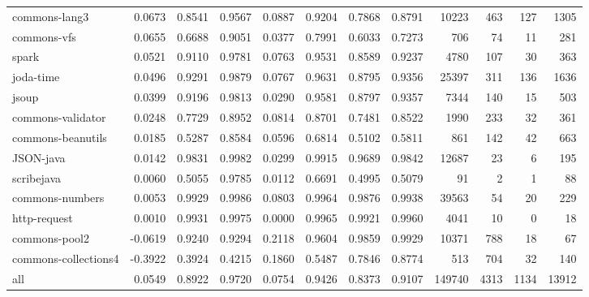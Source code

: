\begin{table}
\begin{tabular}{lrrrrrrrrrrr}
          commons-lang3 &      0.0673 &  0.8541 &     0.9567 &     0.0887 &  0.9204 &     0.7868 &   0.8791 &   10223 &   463 &   127 &   1305 \\
            commons-vfs &      0.0655 &  0.6688 &     0.9051 &     0.0377 &  0.7991 &     0.6033 &   0.7273 &     706 &    74 &    11 &    281 \\
                  spark &      0.0521 &  0.9110 &     0.9781 &     0.0763 &  0.9531 &     0.8589 &   0.9237 &    4780 &   107 &    30 &    363 \\
              joda-time &      0.0496 &  0.9291 &     0.9879 &     0.0767 &  0.9631 &     0.8795 &   0.9356 &   25397 &   311 &   136 &   1636 \\
                  jsoup &      0.0399 &  0.9196 &     0.9813 &     0.0290 &  0.9581 &     0.8797 &   0.9357 &    7344 &   140 &    15 &    503 \\
      commons-validator &      0.0248 &  0.7729 &     0.8952 &     0.0814 &  0.8701 &     0.7481 &   0.8522 &    1990 &   233 &    32 &    361 \\
      commons-beanutils &      0.0185 &  0.5287 &     0.8584 &     0.0596 &  0.6814 &     0.5102 &   0.5811 &     861 &   142 &    42 &    663 \\
              JSON-java &      0.0142 &  0.9831 &     0.9982 &     0.0299 &  0.9915 &     0.9689 &   0.9842 &   12687 &    23 &     6 &    195 \\
             scribejava &      0.0060 &  0.5055 &     0.9785 &     0.0112 &  0.6691 &     0.4995 &   0.5079 &      91 &     2 &     1 &     88 \\
        commons-numbers &      0.0053 &  0.9929 &     0.9986 &     0.0803 &  0.9964 &     0.9876 &   0.9938 &   39563 &    54 &    20 &    229 \\
           http-request &      0.0010 &  0.9931 &     0.9975 &     0.0000 &  0.9965 &     0.9921 &   0.9960 &    4041 &    10 &     0 &     18 \\
          commons-pool2 &     -0.0619 &  0.9240 &     0.9294 &     0.2118 &  0.9604 &     0.9859 &   0.9929 &   10371 &   788 &    18 &     67 \\
   commons-collections4 &     -0.3922 &  0.3924 &     0.4215 &     0.1860 &  0.5487 &     0.7846 &   0.8774 &     513 &   704 &    32 &    140 \\
                    all &      0.0549 &  0.8922 &     0.9720 &     0.0754 &  0.9426 &     0.8373 &   0.9107 &  149740 &  4313 &  1134 &  13912 \\
\bottomrule
\end{tabular}
\end{table}
